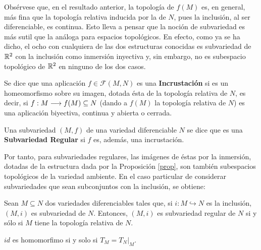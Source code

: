 \documentclass[Cursovd_portada.tex]{subfiles}
\begin{document}
Obsérvese que, en el resultado anterior, la topología de $f(M)$ es, en general, más fina que la topología relativa
inducida por la de $N$, pues la inclusión, al ser diferenciable, es continua. Esto lleva a pensar que la noción de
subvariedad es más sutil que la análoga para espacios topológicos. En efecto, como ya se ha dicho, el ocho con
cualquiera de las dos estructuras conocidas es subvariedad de $\mathbb{R}^2$ con la inclusión como inmersión inyectiva y,
sin embargo, no es subespacio topológico de $\mathbb{R}^2$ en ninguno de los dos casos.
\begin{defi}
Se dice que una aplicación $f\in\mathcal{F}(M,N)$ es una {\bf In\-crus\-ta\-ción} si es un homeomorfismo sobre su
imagen, dotada ésta de la topología relativa de $N$, es decir, si $f:M\longrightarrow f(M)\subseteq N$ (dando a $f(M)$ la
topología relativa de $N$) es una aplicación biyectiva, continua y abierta o cerrada. \end{defi}
\begin{defi}
Una subvariedad $(M,f)$ de una variedad diferenciable $N$ se dice que es una {\bf Subvariedad Regular} si $f$ es,
además, una incrustación.
\end{defi}
Por tanto, para subvariedades regulares, las imágenes de éstas por la inmersión, dotadas de la estructura dada por
la Proposición \ref{prop}, son también subespacios topológicos de la variedad ambiente. En el caso particular de
considerar subvariedades que sean subconjuntos con la inclusión, se obtiene:
\begin{prop}
Sean $M\subseteq N$ dos variedades diferenciables tales que, si $i:M\hookrightarrow N$ es la inclusión, $(M,i)$ es
subvariedad de $N$. Entonces, $(M,i)$ es subvariedad regular de $N$ si y sólo si $M$ tiene la topología relativa
de $N$.
\end{prop}
\begin{dem}
$id$ es homomorfimo si y solo si $T_M = T_{N}|_M$.
\end{dem}
\end{document}
